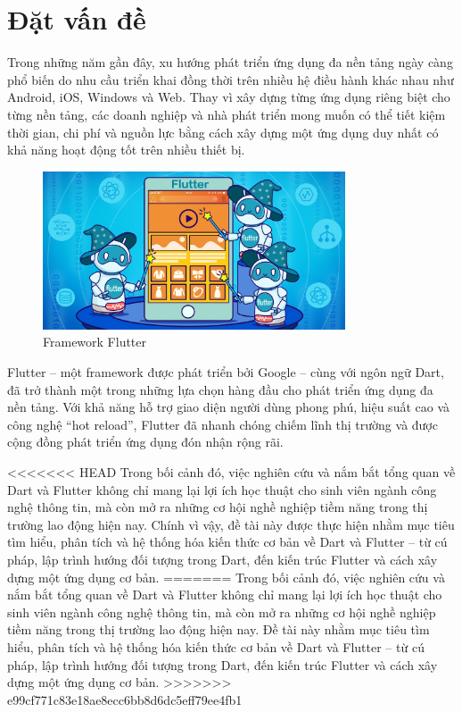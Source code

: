 \section{Đặt vấn đề}
\label{section:1.1}

Trong những năm gần đây, xu hướng phát triển ứng dụng đa nền tảng ngày càng phổ biến do nhu cầu triển khai đồng thời trên nhiều hệ điều hành khác nhau như Android, iOS, Windows và Web. Thay vì xây dựng từng ứng dụng riêng biệt cho từng nền tảng, các doanh nghiệp và nhà phát triển mong muốn có thể tiết kiệm thời gian, chi phí và nguồn lực bằng cách xây dựng một ứng dụng duy nhất có khả năng hoạt động tốt trên nhiều thiết bị. 

\begin{figure}[H]
    \centering
    \includegraphics[width=0.8\textwidth]{Hinhve/Chuong1/flutter_image.jpeg}
    \caption{Framework Flutter}
    \label{fig:flutterimageintro}
\end{figure}

Flutter – một framework được phát triển bởi Google – cùng với ngôn ngữ Dart, đã trở thành một trong những lựa chọn hàng đầu cho phát triển ứng dụng đa nền tảng. Với khả năng hỗ trợ giao diện người dùng phong phú, hiệu suất cao và công nghệ “hot reload”, Flutter đã nhanh chóng chiếm lĩnh thị trường và được cộng đồng phát triển ứng dụng đón nhận rộng rãi.

<<<<<<< HEAD
Trong bối cảnh đó, việc nghiên cứu và nắm bắt tổng quan về Dart và Flutter không chỉ mang lại lợi ích học thuật cho sinh viên ngành công nghệ thông tin, mà còn mở ra những cơ hội nghề nghiệp tiềm năng trong thị trường lao động hiện nay. Chính vì vậy, đề tài này được thực hiện nhằm mục tiêu tìm hiểu, phân tích và hệ thống hóa kiến thức cơ bản về Dart và Flutter – từ cú pháp, lập trình hướng đối tượng trong Dart, đến kiến trúc Flutter và cách xây dựng một ứng dụng cơ bản.
=======
Trong bối cảnh đó, việc nghiên cứu và nắm bắt tổng quan về Dart và Flutter không chỉ mang lại lợi ích học thuật cho sinh viên ngành công nghệ thông tin, mà còn mở ra những cơ hội nghề nghiệp tiềm năng trong thị trường lao động hiện nay. Đề tài này nhằm mục tiêu tìm hiểu, phân tích và hệ thống hóa kiến thức cơ bản về Dart và Flutter – từ cú pháp, lập trình hướng đối tượng trong Dart, đến kiến trúc Flutter và cách xây dựng một ứng dụng cơ bản.
>>>>>>> e99cf771c83e18ae8ecc6bb8d6dc5eff79ee4fb1

